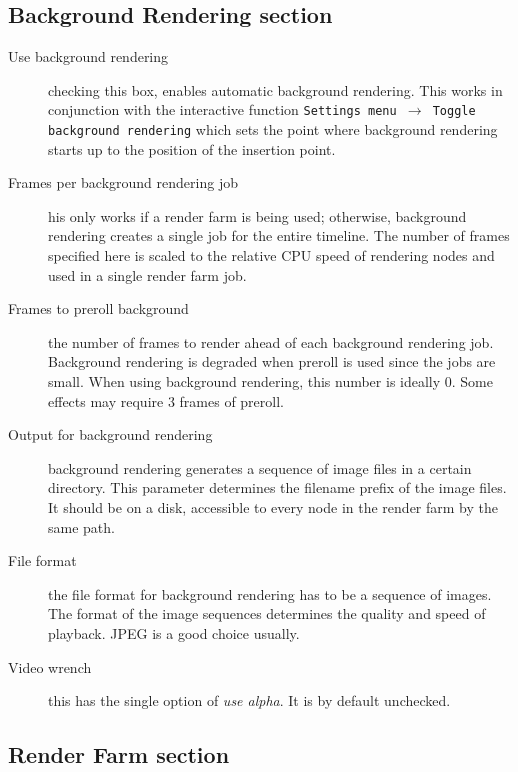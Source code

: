 \subsection{Background Rendering section}%
\label{sub:background_rendering_section}

\begin{description}
    \item[Use background rendering]  checking this box, enables automatic background rendering.  This works in conjunction with the interactive function \texttt{Settings menu $\rightarrow$ Toggle background rendering} which sets the point where background rendering starts up to the position of the insertion point.
    \item[Frames per background rendering job]  his only works if a render farm is being used; otherwise, background rendering creates a single job for the entire timeline. The number of frames specified here is scaled to the relative CPU speed of rendering nodes and used in a single render farm job.
    \item[Frames to preroll background]  the number of frames to render ahead of each background rendering job. Background rendering is degraded when preroll is used since the jobs are small. When using background rendering, this number is ideally 0. Some effects may require 3 frames of preroll.
    \item[Output for background rendering]  background rendering generates a sequence of image files in a certain directory. This parameter determines the filename prefix of the image files. It should be on a disk, accessible to every node in the render farm by the same path.
    \item[File format]  the file format for background rendering has to be a sequence of images. The format of the image sequences determines the quality and speed of playback. JPEG is a good choice usually.
    \item[Video wrench]  this has the single option of \textit{use alpha}.  It is by default unchecked.
\end{description}

\subsection{Render Farm section}%
\label{sub:render_farm_section}

